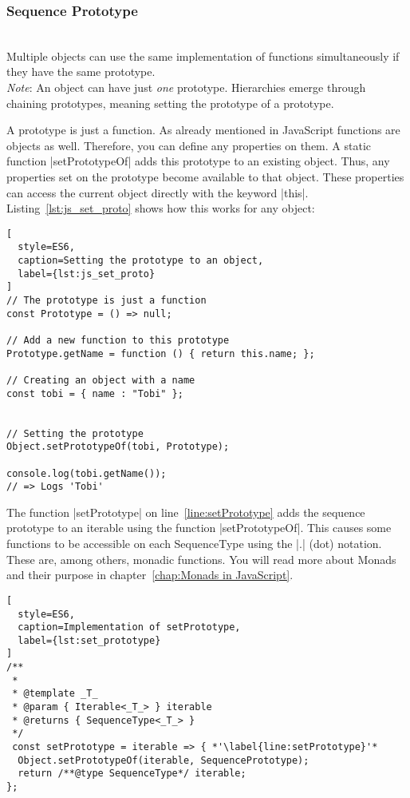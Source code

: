 \subsubsection{Sequence Prototype}
\label{subsub:Sequence Prototype}
\\ 
Multiple objects can use the same implementation of functions simultaneously if
they have the same prototype.\\
\textit{Note}: An object can have just \textit{one} prototype. Hierarchies
emerge through chaining prototypes, meaning setting the prototype of a
prototype.

A prototype is just a function. As already mentioned in JavaScript functions
are objects as well. Therefore, you can define any properties on them. A static
function |setPrototypeOf| adds this prototype to an existing object. Thus, any
properties set on the prototype become available to that object. These
properties can access the current object directly with the keyword |this|.
Listing~\ref{lst:js_set_proto} shows how this works for any object:

\begin{lstlisting}[
  style=ES6,
  caption=Setting the prototype to an object,
  label={lst:js_set_proto}
]
// The prototype is just a function
const Prototype = () => null; 

// Add a new function to this prototype
Prototype.getName = function () { return this.name; };

// Creating an object with a name
const tobi = { name : "Tobi" };


// Setting the prototype
Object.setPrototypeOf(tobi, Prototype);

console.log(tobi.getName());
// => Logs 'Tobi' 
\end{lstlisting}


The function |setPrototype| on line~\ref{line:setPrototype} adds the sequence
prototype to an iterable using the function |setPrototypeOf|. This causes some
functions to be accessible on each SequenceType using the |.| (dot) notation. These are,
among others, monadic functions. You will read more about Monads and their
purpose in chapter~\ref{chap:Monads in JavaScript}.
\begin{lstlisting}[
  style=ES6,
  caption=Implementation of setPrototype,
  label={lst:set_prototype}
]
/**
 *
 * @template _T_
 * @param { Iterable<_T_> } iterable
 * @returns { SequenceType<_T_> }
 */
 const setPrototype = iterable => { *'\label{line:setPrototype}'*
  Object.setPrototypeOf(iterable, SequencePrototype);
  return /**@type SequenceType*/ iterable;
};
\end{lstlisting}

